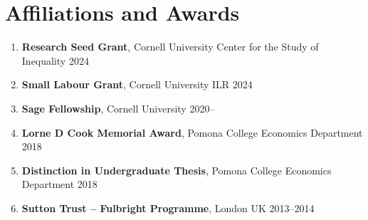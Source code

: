 \documentclass[letterpaper,11pt,oneside]{article}
\begin{document}
\section*{Affiliations and Awards}
\begin{enumerate}[itemsep=2pt, label={}]
    \item \textbf{Research Seed Grant}, Cornell University Center for the Study of Inequality \hfill 2024
    \item \textbf{Small Labour Grant}, Cornell University ILR \hfill 2024
    \item \textbf{Sage Fellowship}, Cornell University \hfill 2020--
    \item \textbf{Lorne D Cook Memorial Award}, Pomona College Economics Department \hfill 2018
    \item \textbf{Distinction in Undergraduate Thesis}, Pomona College Economics Department \hfill 2018
    \item \textbf{Sutton Trust -- Fulbright Programme}, London UK \hfill 2013--2014
\end{enumerate}
\end{document}
